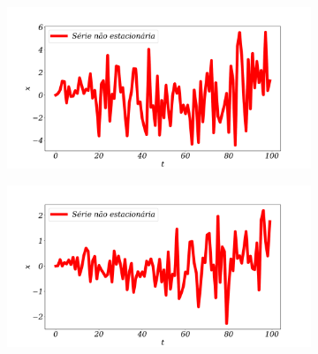 \begin{figure}[H]
	\begin{subfigure}{0.39\textwidth}
		\includegraphics[width=\linewidth]{Revisao/Figuras/serie_nao_estacionaria_2}
	\end{subfigure}	\hfill
	\begin{subfigure}{0.39\textwidth}
		\includegraphics[width=\linewidth]{Revisao/Figuras/serie_nao_estacionaria_3}
	\end{subfigure}
	

\end{figure}

	
		
